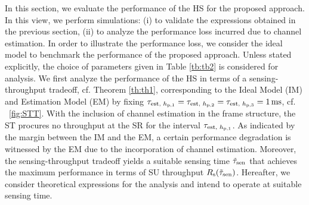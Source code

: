 In this section, we evaluate the performance of the HS for the proposed approach. In this view, we perform simulations: (i) to validate the expressions obtained in the previous section, (ii) to analyze the performance loss incurred due to channel estimation. In order to illustrate the performance loss, we consider the ideal model to benchmark the performance of the proposed approach. Unless stated explicitly, the choice of parameters given in Table \ref{tb:tb2} is considered for analysis. We first analyze the performance of the HS in terms of a sensing-throughput tradeoff, cf. Theorem \ref{th:th1}, corresponding to the Ideal Model (IM) and Estimation Model (EM) by fixing $\tau_{\text{est, $h_{\text{p,1}}$}} = \tau_{\text{est, $h_{\text{p,2}}$}} =  \tau_{\text{est, $h_{\text{p,3}}$}} = \SI{1}{ms}$, cf. \figurename~\ref{fig:STT}. With the inclusion of channel estimation in the frame structure, the ST procures no throughput at the SR for the interval $\tau_{\text{est, $h_{\text{p,1}}$}}$. As indicated by the margin between the IM and the EM, a certain performance degradation is witnessed by the EM due to the incorporation of channel estimation. Moreover, the sensing-throughput tradeoff yields a suitable sensing time $\tilde{\tau}_{\text{sen}}$ that achieves the maximum performance in terms of SU throughput $R_{\text{s}}(\tilde{\tau}_{\text{sen}})$. Hereafter, we consider theoretical expressions for the analysis and intend to operate at suitable sensing time. %




